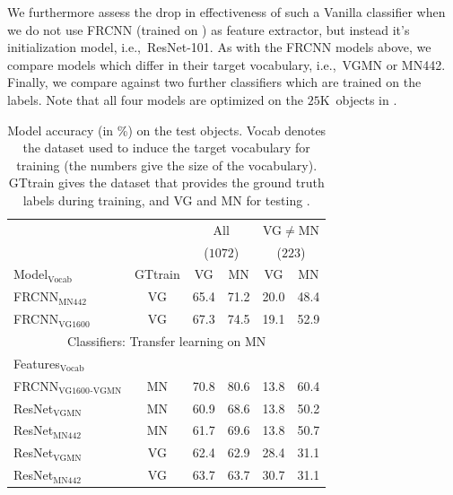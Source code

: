 We furthermore assess the drop in effectiveness of such a Vanilla  classifier when we do not use FRCNN (trained on \vg) as feature extractor, but instead it's initialization model, i.e.,~ResNet-101. 
As with the FRCNN models above, we compare models which differ in  their target vocabulary, i.e.,~VGMN or MN442. 
 Finally, we compare against two further classifiers which are trained on the \vg labels. 
Note that all four models are optimized on the $25$K~objects in \mn. 

\begin{table}[t]
	\centering
	\small
	\begin{tabular}{@{~}l@{~}|@{~}c@{~}|cc|cc@{~}}
		\toprule
		&  & \multicolumn{2}{c}{All} 
		& \multicolumn{2}{c}{VG$\neq$MN}\\
		&  & \multicolumn{2}{c}{($1072$)} 
		& \multicolumn{2}{c}{($223$)}\\	
		Model$_{\text{Vocab}}$ 
		&  GTtrain &  VG & MN 
		&  VG & MN \\ 
		\midrule
		FRCNN$_{\text{MN442}}$ & VG &  65.4 &      71.2 &   20.0 &      48.4  \\
		FRCNN$_{\text{VG1600}}$ & VG &    67.3 &      74.5 &    19.1 &      52.9  \\
		\midrule \midrule
		\multicolumn{6}{c}{Classifiers: Transfer learning on MN}\\
		Features$_{\text{Vocab}}$ &   \\
		\midrule 
		FRCNN$_{\text{VG1600}}$$_{\text{-VGMN}}$ & MN &    70.8 &      80.6 &    13.8 &      60.4  \\ 
		\midrule
		ResNet$_{\text{VGMN}}$ & MN  & 60.9 &  68.6 &  13.8 & 50.2  \\
		
		ResNet$_{\text{MN442}}$ & MN &            61.7 &              69.6 &                        13.8 &              50.7 \\
		ResNet$_{\text{VGMN}}$  &   VG &  62.4 &              62.9 &              28.4 &              31.1  \\
		ResNet$_{\text{MN442}}$ & VG  &            63.7 &              63.7 &                  30.7 &              31.1  \\
		\bottomrule
	\end{tabular}
	\caption{Model accuracy (in \%) on the \mn test objects. Vocab denotes the dataset used to induce the target vocabulary for training (the numbers give the size of the vocabulary). GTtrain gives the dataset that provides the ground truth labels during training, and VG and MN for testing \label{tab:exp_VGvsMN}.}
\end{table}

